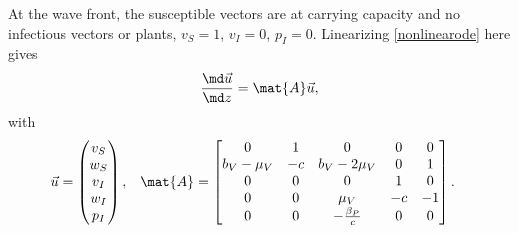\documentclass{jpmarticle}
\begin{document}
At the wave front, the susceptible vectors are at carrying capacity
and no infectious vectors or plants,
$v_S = 1$, $v_I = 0$, $p_I = 0$.
Linearizing \eqref{nonlinearode} here gives
\begin{equation}
  \frac{\md \vec{u}}{\md z}
  = \mat{A} \vec{u},
\end{equation}
with
\begin{align}
  \vec{u} &=
  \begin{pmatrix}
    v_S \\ w_S \\ v_I \\ w_I \\ p_I
  \end{pmatrix},
  &
  \mat{A} &=
  \begin{bmatrix}
    0 & 1 & 0 & 0 & 0
    \\
    b_V - \mu_V & - c & b_V - 2 \mu_V & 0 & 1
    \\
    0 & 0 & 0 & 1 & 0 \\
    0 & 0 & \mu_V & - c & - 1 \\
    0 & 0 & - \frac{\beta_P}{c} & 0 & 0
  \end{bmatrix}.
\end{align}
\end{document}
